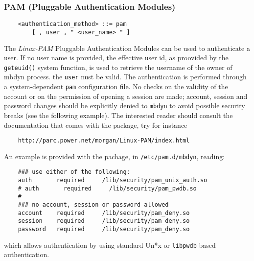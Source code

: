\subsubsection{PAM (Pluggable Authentication Modules)}
\begin{verbatim}
    <authentication_method> ::= pam 
        [ , user , " <user_name> " ]
\end{verbatim}
The {\em Linux-PAM} Pluggable Authentication Modules can be used to
authenticate a user. 
If no user name is provided, the effective user id, as proovided by the 
\texttt{geteuid()} system function, is used to retrieve the username of the
owner of mbdyn process.
the \texttt{user} nust be valid. 
The authentication is performed through a system-dependent \texttt{pam}
configuration file.
No checks on the validity of the account or on the permission of opening a
session are made; account, session and password changes should be explicitly
denied to \texttt{mbdyn} to avoid possible security breaks (see the following
example).
The interested reader should consult the documentation that comes with the
package, try for instance
\begin{verbatim}
    http://parc.power.net/morgan/Linux-PAM/index.html
\end{verbatim}
An example is provided with the pachage, in  \texttt{/etc/pam.d/mbdyn}, reading:
\begin{verbatim}
    ### use either of the following:
    auth       required     /lib/security/pam_unix_auth.so
    # auth       required     /lib/security/pam_pwdb.so
    #
    ### no account, session or password allowed
    account    required     /lib/security/pam_deny.so
    session    required     /lib/security/pam_deny.so
    password   required     /lib/security/pam_deny.so
\end{verbatim}
which allows authentication by using standard Un*x or \texttt{libpwdb} based
authentication.





